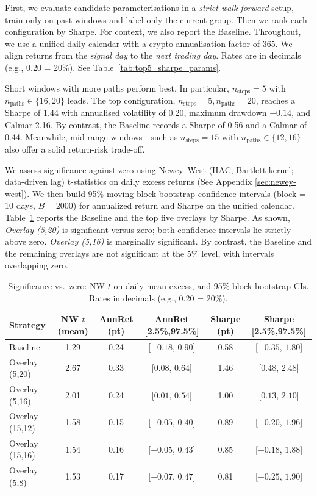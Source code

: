 First, we evaluate candidate parameterisations in a \emph{strict walk-forward} setup, train only on past windows and label only the current group. Then we rank each configuration by Sharpe. For context, we also report the Baseline. Throughout, we use a unified daily calendar with a crypto annualisation factor of 365. We align returns from the \emph{signal day} to the \emph{next trading day}. Rates are in decimals (e.g., 0.20 = 20\%). See Table~\ref{tab:top5_sharpe_params}.

Short windows with more paths perform best. In particular, \(n_{\text{steps}}=5\) with \(n_{\text{paths}}\in\{16,20\}\) leads. The top configuration, \(n_{\text{steps}}=5, n_{\text{paths}}=20\), reaches a Sharpe of 1.44 with annualised volatility of 0.20, maximum drawdown \(-0.14\), and Calmar 2.16. By contrast, the Baseline records a Sharpe of 0.56 and a Calmar of 0.44. Meanwhile, mid-range windows—such as \(n_{\text{steps}}=15\) with \(n_{\text{paths}}\in\{12,16\}\)—also offer a solid return-risk trade-off.

We assess significance against zero using Newey--West (HAC, Bartlett kernel; data-driven lag) t-statistics on daily excess returns (See Appendix \ref{sec:newey-west}).
We then build 95\% moving-block bootstrap confidence intervals (block = 10 days, $B=2000$) for annualized return and Sharpe on the unified calendar.
Table~\ref{tab:sig_compact} reports the Baseline and the top five overlays by Sharpe.
As shown, \emph{Overlay (5,20)} is significant versus zero; both confidence intervals lie strictly above zero.
\emph{Overlay (5,16)} is marginally significant.
By contrast, the Baseline and the remaining overlays are not significant at the 5\% level, with intervals overlapping zero.

\begin{table}[t]
\centering
\caption{Significance vs.\ zero: NW $t$ on daily mean excess, and 95\% block-bootstrap CIs. Rates in decimals (e.g., 0.20 = 20\%).}
\label{tab:sig_compact}
\small
\begin{tabular}{lccccc}
\toprule
Strategy & NW $t$ (mean) & AnnRet (pt) & AnnRet [2.5\%,97.5\%] & Sharpe (pt) & Sharpe [2.5\%,97.5\%] \\
\midrule
Baseline        & 1.29 & 0.24 & [$-0.18$, $0.90$] & 0.58 & [$-0.35$, $1.80$] \\
Overlay (5,20)  & 2.67 & 0.33 & [$0.08$,  $0.64$] & 1.46 & [$0.48$,  $2.48$] \\
Overlay (5,16)  & 2.01 & 0.24 & [$0.01$,  $0.54$] & 1.00 & [$0.13$,  $2.10$] \\
Overlay (15,12) & 1.58 & 0.15 & [$-0.05$, $0.40$] & 0.89 & [$-0.20$, $1.96$] \\
Overlay (15,16) & 1.54 & 0.16 & [$-0.05$, $0.43$] & 0.85 & [$-0.18$, $1.88$] \\
Overlay (5,8)   & 1.53 & 0.17 & [$-0.07$, $0.47$] & 0.81 & [$-0.25$, $1.90$] \\
\bottomrule
\end{tabular}
\end{table}

